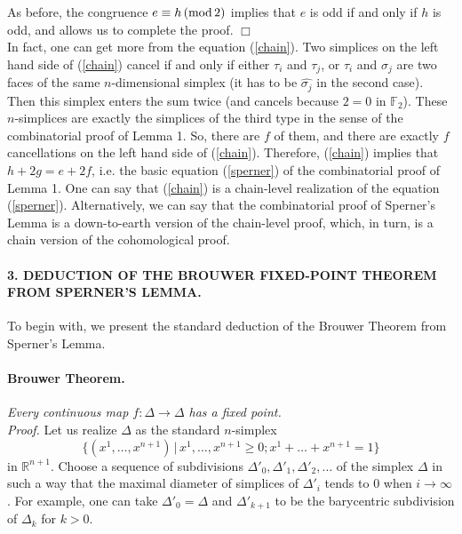 \documentclass[leqno, 11pt]{article}\usepackage{latexsym}\usepackage{amsmath, amscd}\usepackage{amssymb}
\begin{document}
As before, the congruence $e\equiv h\, ({\rm mod}\, 2)$ implies that $e$ is odd if and only if $h$ is odd, and allows us to complete the proof. $\Box$\\ 

In fact, one can get more from the equation (\ref{chain}). Two simplices on the left hand side of (\ref{chain}) cancel if and only if either $\tau_i$ and $\tau_j$, or $\tau_i$ and $\sigma_j$ are two faces of the same $n$-dimensional simplex (it has to be $\widehat{\sigma_j}$ in the second case). Then this simplex enters the sum twice (and cancels because $2=0$ in $\mathbb{F}_2$). These $n$-simplices are exactly the simplices of the third type in the sense of the combinatorial proof of Lemma 1. So, there are $f$ of them, and there are exactly $f$ cancellations on the left hand side of (\ref{chain}). Therefore, (\ref{chain}) implies that $h+2g=e+2f$, i.e. the basic equation (\ref{sperner}) of the combinatorial proof of Lemma 1. One can say that (\ref{chain}) is a chain-level realization of the equation (\ref{sperner}). Alternatively, we can say that the combinatorial proof of Sperner's Lemma is a down-to-earth version of the chain-level proof, which, in turn, is a chain version of the cohomological proof.

\paragraph{3. DEDUCTION OF THE BROUWER FIXED-POINT THEOREM FROM SPERNER'S LEMMA.} To begin with, 
we present the standard deduction of the Brouwer Theorem from Sperner's Lemma.

\paragraph{Brouwer Theorem.} {\em Every continuous map $f:\Delta\rightarrow\Delta$ has a fixed point.}\\ 

\noindent
{\em Proof.} Let us realize $\Delta$ as the standard $n$-simplex 
\[\{(x^1,\ldots,x^{n+1})\,|\, x^1,\ldots,x^{n+1}\geqslant 0; x^1+\ldots+x^{n+1}=1\}\]
in ${\mathbb R}^{n+1}$. Choose a sequence of subdivisions $\Delta'_0,\Delta'_1, \Delta'_2, \ldots$ of the simplex $\Delta$ in such a way that the maximal diameter of  simplices of $\Delta'_i$ tends to $0$ when $i\rightarrow\infty$. For example, one can take $\Delta'_0=\Delta$ and $\Delta'_{k+1}$ to be the barycentric subdivision of $\Delta_k$ for $k>0$. 
\end{document}
